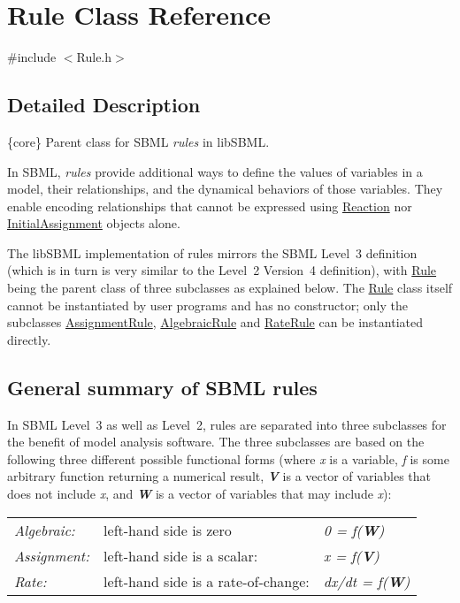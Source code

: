 \hypertarget{class_rule}{}\section{Rule Class Reference}
\label{class_rule}


{\ttfamily \#include $<$Rule.\+h$>$}



\subsection{Detailed Description}
\{core\} Parent class for S\+B\+ML {\itshape rules} in lib\+S\+B\+ML.

In S\+B\+ML, {\itshape rules} provide additional ways to define the values of variables in a model, their relationships, and the dynamical behaviors of those variables. They enable encoding relationships that cannot be expressed using \hyperlink{class_reaction}{Reaction} nor \hyperlink{class_initial_assignment}{Initial\+Assignment} objects alone.

The lib\+S\+B\+ML implementation of rules mirrors the S\+B\+ML Level~3 definition (which is in turn is very similar to the Level~2 Version~4 definition), with \hyperlink{class_rule}{Rule} being the parent class of three subclasses as explained below. The \hyperlink{class_rule}{Rule} class itself cannot be instantiated by user programs and has no constructor; only the subclasses \hyperlink{class_assignment_rule}{Assignment\+Rule}, \hyperlink{class_algebraic_rule}{Algebraic\+Rule} and \hyperlink{class_rate_rule}{Rate\+Rule} can be instantiated directly.\hypertarget{classdoc__rules__general__summary_rules-general}{}\subsection{General summary of S\+B\+M\+L rules}\label{classdoc__rules__general__summary_rules-general}
In S\+B\+ML Level~3 as well as Level~2, rules are separated into three subclasses for the benefit of model analysis software. The three subclasses are based on the following three different possible functional forms (where {\itshape x} is a variable, {\itshape f} is some arbitrary function returning a numerical result, {\bfseries {\itshape V}} is a vector of variables that does not include {\itshape x}, and {\bfseries {\itshape W}} is a vector of variables that may include {\itshape x})\+:

\tabulinesep=1mm
\begin{longtabu} spread 0pt [c]{*{3}{|X[-1]}|}
\hline
{\itshape Algebraic\+:}&left-\/hand side is zero&{\itshape 0 = f({\bfseries W})} \\
{\itshape Assignment\+:}&left-\/hand side is a scalar\+:&{\itshape x = f({\bfseries V})} \\
{\itshape Rate\+:}&left-\/hand side is a rate-\/of-\/change\+:&{\itshape dx/dt = f({\bfseries W})} \\
\end{longtabu}


